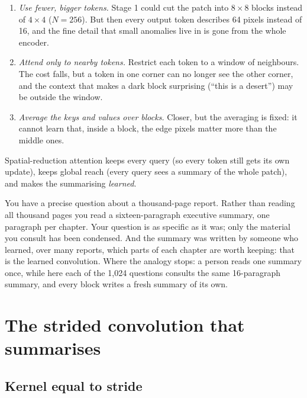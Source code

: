 \begin{enumerate}
  \item \emph{Use fewer, bigger tokens.} Stage 1 could cut the patch into $8\times8$ blocks
  instead of $4\times4$ ($N = 256$). But then every output token describes 64 pixels instead of
  16, and the fine detail that small anomalies live in is gone from the whole encoder.
  \item \emph{Attend only to nearby tokens.} Restrict each token to a window of neighbours. The
  cost falls, but a token in one corner can no longer see the other corner, and the context that
  makes a dark block surprising (``this is a desert'') may be outside the window.
  \item \emph{Average the keys and values over blocks.} Closer, but the averaging is fixed: it
  cannot learn that, inside a block, the edge pixels matter more than the middle ones.
\end{enumerate}
Spatial-reduction attention keeps every query (so every token still gets its own update), keeps
global reach (every query sees a summary of the whole patch), and makes the summarising
\emph{learned}.

\begin{analogy}
You have a precise question about a thousand-page report. Rather than reading all thousand pages
you read a sixteen-paragraph executive summary, one paragraph per chapter. Your question is as
specific as it was; only the material you consult has been condensed. And the summary was written
by someone who learned, over many reports, which parts of each chapter are worth keeping: that is
the learned convolution. Where the analogy stops: a person reads one summary once, while here
each of the 1{,}024 questions consults the same 16-paragraph summary, and every block writes a
fresh summary of its own.
\end{analogy}

\section{The strided convolution that summarises}\label{sec:esa:conv}

\subsection{Kernel equal to stride}

